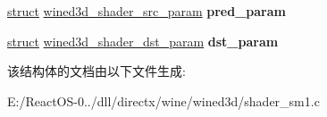 \begin{DoxyCompactItemize}
\item 
\mbox{\label{structwined3d__sm1__data_adcfb18bd6b926bbf303e777b5f23c83e}} 
\hyperlink{interfacestruct}{struct} \hyperlink{structwined3d__shader__src__param}{wined3d\+\_\+shader\+\_\+src\+\_\+param} {\bfseries pred\+\_\+param}
\item 
\mbox{\label{structwined3d__sm1__data_a3c9f25c82925dc76a0f87e7330d888e4}} 
\hyperlink{interfacestruct}{struct} \hyperlink{structwined3d__shader__dst__param}{wined3d\+\_\+shader\+\_\+dst\+\_\+param} {\bfseries dst\+\_\+param}
\end{DoxyCompactItemize}


该结构体的文档由以下文件生成\+:\begin{DoxyCompactItemize}
\item 
E\+:/\+React\+O\+S-\/0../dll/directx/wine/wined3d/shader\+\_\+sm1.\+c\end{DoxyCompactItemize}
